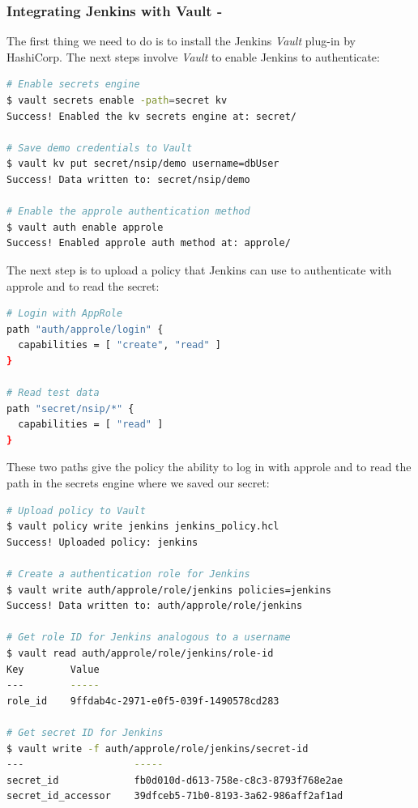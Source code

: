 \documentclass[runningheads]{llncs}
\begin{document}
\subsubsection{Integrating Jenkins with Vault -} The first thing we need to do is to install the Jenkins \textit{Vault} plug-in by HashiCorp. The next steps involve \textit{Vault} to enable Jenkins to authenticate: 

\begin{lstlisting}[language=bash]
# Enable secrets engine
$ vault secrets enable -path=secret kv
Success! Enabled the kv secrets engine at: secret/

# Save demo credentials to Vault
$ vault kv put secret/nsip/demo username=dbUser
Success! Data written to: secret/nsip/demo

# Enable the approle authentication method 
$ vault auth enable approle
Success! Enabled approle auth method at: approle/
\end{lstlisting}

The next step is to upload a policy that Jenkins can use to authenticate with approle and to read the secret: 

\begin{lstlisting}[language=bash]
# Login with AppRole
path "auth/approle/login" {
  capabilities = [ "create", "read" ]
}

# Read test data
path "secret/nsip/*" {
  capabilities = [ "read" ]
}
\end{lstlisting}

These two paths give the policy the ability to log in with approle and to read the path in the secrets engine where we saved our secret:

\begin{lstlisting}[language=bash]
# Upload policy to Vault
$ vault policy write jenkins jenkins_policy.hcl
Success! Uploaded policy: jenkins

# Create a authentication role for Jenkins
$ vault write auth/approle/role/jenkins policies=jenkins
Success! Data written to: auth/approle/role/jenkins

# Get role ID for Jenkins analogous to a username
$ vault read auth/approle/role/jenkins/role-id
Key        Value
---        -----
role_id    9ffdab4c-2971-e0f5-039f-1490578cd283

# Get secret ID for Jenkins
$ vault write -f auth/approle/role/jenkins/secret-id
---                   -----
secret_id             fb0d010d-d613-758e-c8c3-8793f768e2ae
secret_id_accessor    39dfceb5-71b0-8193-3a62-986aff2af1ad
\end{lstlisting}
\end{document}
